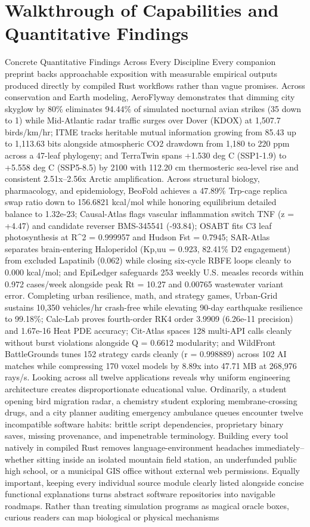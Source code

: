 \documentclass[10pt,letterpaper]{article}
\begin{document}
\section{Walkthrough of Capabilities and Quantitative Findings}
Concrete Quantitative Findings Across Every Discipline Every companion preprint backs approachable exposition with measurable empirical outputs produced directly by compiled Rust workflows rather than vague promises. Across conservation and Earth modeling, AeroFlyway demonstrates that dimming city skyglow by 80\% eliminates 94.44\% of simulated nocturnal avian strikes (35 down to 1) while Mid-Atlantic radar traffic surges over Dover (KDOX) at 1,507.7 birds/km/hr; ITME tracks heritable mutual information growing from 85.43 up to 1,113.63 bits alongside atmospheric CO2 drawdown from 1,180 to 220 ppm across a 47-leaf phylogeny; and TerraTwin spans +1.530 deg C (SSP1-1.9) to +5.558 deg C (SSP5-8.5) by 2100 with 112.20 cm thermosteric sea-level rise and consistent 2.51x--2.56x Arctic amplification. Across structural biology, pharmacology, and epidemiology, BeoFold achieves a 47.89\% Trp-cage replica swap ratio down to 156.6821 kcal/mol while honoring equilibrium detailed balance to 1.32e-23; Causal-Atlas flags vascular inflammation switch TNF (z = +4.47) and candidate reverser BMS-345541 (-93.84); OSABT fits C3 leaf photosynthesis at R\textasciicircum{}2 = 0.999957 and Hudson Fst = 0.7945; SAR-Atlas separates brain-entering Haloperidol (Kp,uu = 0.923, 82.41\% D2 engagement) from excluded Lapatinib (0.062) while closing six-cycle RBFE loops cleanly to 0.000 kcal/mol; and EpiLedger safeguards 253 weekly U.S. measles records within 0.972 cases/week alongside peak Rt = 10.27 and 0.00765 wastewater variant error. Completing urban resilience, math, and strategy games, Urban-Grid sustains 10,350 vehicles/hr crash-free while elevating 90-day earthquake resilience to 99.18\%; Calc-Lab proves fourth-order RK4 order 3.9909 (6.26e-11 precision) and 1.67e-16 Heat PDE accuracy; Cit-Atlas spaces 128 multi-API calls cleanly without burst violations alongside Q = 0.6612 modularity; and WildFront BattleGrounds tunes 152 strategy cards cleanly (r = 0.998889) across 102 AI matches while compressing 170 voxel models by 8.89x into 47.71 MB at 268,976 rays/s. Looking across all twelve applications reveals why uniform engineering architecture creates disproportionate educational value. Ordinarily, a student opening bird migration radar, a chemistry student exploring membrane-crossing drugs, and a city planner auditing emergency ambulance queues encounter twelve incompatible software habits: brittle script dependencies, proprietary binary saves, missing provenance, and impenetrable terminology. Building every tool natively in compiled Rust removes language-environment headaches immediately--whether sitting inside an isolated mountain field station, an underfunded public high school, or a municipal GIS office without external web permissions. Equally important, keeping every individual source module clearly listed alongside concise functional explanations turns abstract software repositories into navigable roadmaps. Rather than treating simulation programs as magical oracle boxes, curious readers can map biological or physical mechanisms 
\end{document}
